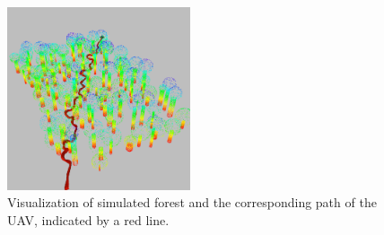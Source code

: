             \begin{figure}[H]
                \centering
                \includegraphics[width=0.48\textwidth]{./fig/rviz/simulation_forest.png}
                \caption{
                    Visualization of simulated forest and the corresponding path of the UAV, indicated by a red line.
                }
                \label{fig:simulated_forest_path}
            \end{figure}

